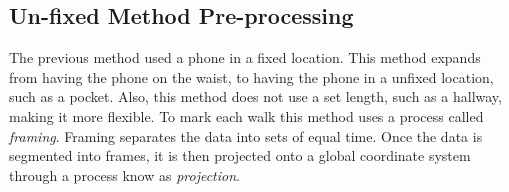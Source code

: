 \documentclass{sig-alternate}
\begin{document}
\subsection{Un-fixed Method Pre-processing}{
	The previous method used a phone in a fixed location. This method expands from having the phone on the waist, to having the phone in a unfixed location, such as a pocket. Also, this method does not use a set length, such as a hallway, making it more flexible. To mark each walk this method uses a process called \textit{framing}. Framing separates the data into sets of equal time. Once the data is segmented into frames, it is then projected onto a global coordinate system through a process know as \textit{projection}.}
		
\end{document}
